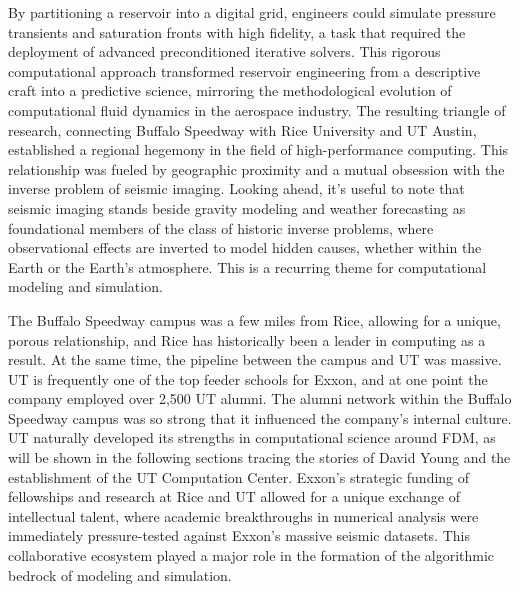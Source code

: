 By partitioning a reservoir into a digital grid, engineers could simulate pressure transients and saturation fronts with high fidelity, a task that required the deployment of advanced preconditioned iterative solvers. This rigorous computational approach transformed reservoir engineering from a descriptive craft into a predictive science, mirroring the methodological evolution of computational fluid dynamics in the aerospace industry. The resulting triangle of research, connecting Buffalo Speedway with Rice University and UT Austin, established a regional hegemony in the field of high-performance computing. This relationship was fueled by geographic proximity and a mutual obsession with the inverse problem of seismic imaging. Looking ahead, it’s useful to note that seismic imaging stands beside gravity modeling and weather forecasting as foundational members of the class of historic inverse problems, where observational effects are inverted to model hidden causes, whether within the Earth or the Earth’s atmosphere. This is a recurring theme for computational modeling and simulation.

The Buffalo Speedway campus was a few miles from Rice, allowing for a unique, porous relationship, and Rice has historically been a leader in computing as a result. At the same time, the pipeline between the campus and UT was massive. UT is frequently one of the top feeder schools for Exxon, and at one point the company employed over 2,500 UT alumni. The alumni network within the Buffalo Speedway campus was so strong that it influenced the company's internal culture. UT naturally developed its strengths in computational science around FDM, as will be shown in the following sections tracing the stories of David Young and the establishment of the UT Computation Center. Exxon’s strategic funding of fellowships and research at Rice and UT allowed for a unique exchange of intellectual talent, where academic breakthroughs in numerical analysis were immediately pressure-tested against Exxon’s massive seismic datasets. This collaborative ecosystem played a major role in the formation of the algorithmic bedrock of modeling and simulation. 
